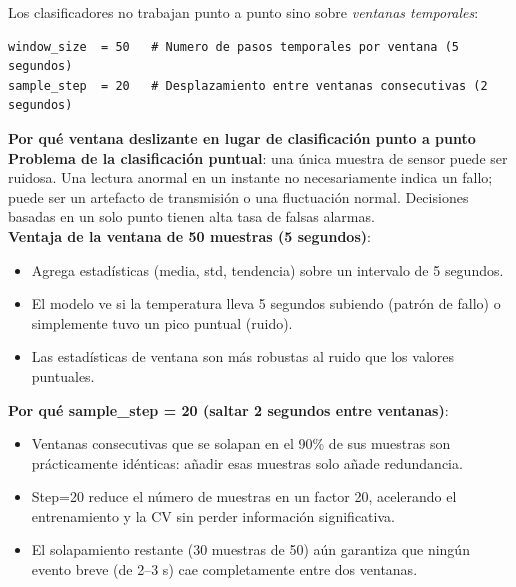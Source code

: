 \documentclass[12pt,a4paper]{article}
\begin{document}
Los clasificadores no trabajan punto a punto sino sobre \textit{ventanas temporales}:

\begin{lstlisting}[caption={Configuraci\'{o}n de ventana deslizante}]
window_size  = 50   # Numero de pasos temporales por ventana (5 segundos)
sample_step  = 20   # Desplazamiento entre ventanas consecutivas (2 segundos)
\end{lstlisting}

\begin{porquebox}
\textbf{Por qu\'{e} ventana deslizante en lugar de clasificaci\'{o}n punto a punto}\\[4pt]
\textbf{Problema de la clasificaci\'{o}n puntual}: una \'{u}nica muestra de sensor puede
ser ruidosa. Una lectura anormal en un instante no necesariamente indica un fallo;
puede ser un artefacto de transmisi\'{o}n o una fluctuaci\'{o}n normal. Decisiones basadas
en un solo punto tienen alta tasa de falsas alarmas.\\[4pt]
\textbf{Ventaja de la ventana de 50 muestras (5 segundos)}:
\begin{itemize}[itemsep=2pt]
  \item Agrega estad\'{i}sticas (media, std, tendencia) sobre un intervalo de 5 segundos.
  \item El modelo ve si la temperatura lleva 5 segundos subiendo (patr\'{o}n de fallo)
    o simplemente tuvo un pico puntual (ruido).
  \item Las estad\'{i}sticas de ventana son m\'{a}s robustas al ruido que los valores
    puntuales.
\end{itemize}
\textbf{Por qu\'{e} sample\_step = 20 (saltar 2 segundos entre ventanas)}:
\begin{itemize}[itemsep=2pt]
  \item Ventanas consecutivas que se solapan en el 90\% de sus muestras son
    pr\'{a}cticamente id\'{e}nticas: a\~{n}adir esas muestras solo a\~{n}ade redundancia.
  \item Step=20 reduce el n\'{u}mero de muestras en un factor 20, acelerando
    el entrenamiento y la CV sin perder informaci\'{o}n significativa.
  \item El solapamiento restante (30 muestras de 50) a\'{u}n garantiza que ning\'{u}n
    evento breve (de 2--3 s) cae completamente entre dos ventanas.
\end{itemize}
\end{porquebox}

\end{document}
